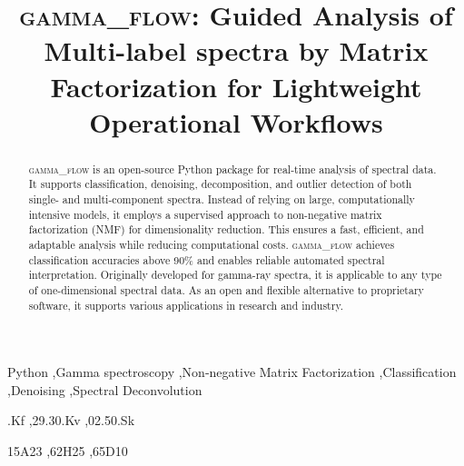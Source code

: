 \documentclass[review, 12pt, a4paper]{elsarticle}
\begin{document}
\renewcommand{\labelenumii}{\arabic{enumi}.\arabic{enumii}}

\begin{frontmatter}

\title{\textbf{\textsc{gamma\_flow}}: \textbf{G}uided \textbf{A}nalysis of \textbf{M}ulti-label spectra by \textbf{Ma}trix \textbf{F}actorization for \textbf{L}ightweight \textbf{O}perational \textbf{W}orkflows}





\begin{abstract}
\textsc{gamma\_flow} is an open-source Python package for real-time analysis of spectral data. It supports classification, denoising, decomposition, and outlier detection of both single- and multi-component spectra. Instead of relying on large, computationally intensive models, it employs a supervised approach to non-negative matrix factorization (NMF) for dimensionality reduction. This ensures a fast, efficient, and adaptable analysis while reducing computational costs. \textsc{gamma\_flow} achieves classification accuracies above 90\% and enables reliable automated spectral interpretation. Originally developed for gamma-ray spectra, it is applicable to any type of one-dimensional spectral data. As an open and flexible alternative to proprietary software, it supports various applications in research and industry.
\end{abstract}

\begin{keyword}
Python \sep Gamma spectroscopy \sep Non-negative Matrix Factorization \sep Classification \sep Denoising \sep Spectral Deconvolution

.Kf %
\sep 29.30.Kv %
\sep 02.50.Sk %

\MSC[2020] 15A23 %
\sep 62H25 %
\sep 65D10 %

\end{keyword}

\end{frontmatter}
\end{document}

